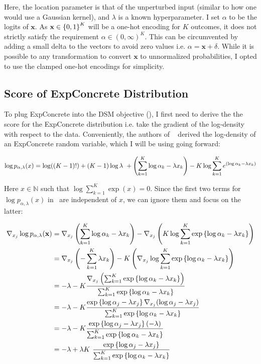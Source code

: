 Here, the location parameter is that of the unperturbed input (similar to how one would use a Gaussian kernel), and $\lambda$ is a known hyperparameter. I set $\alpha$ to be the logits of $\mathbf{x}$. As $\mathbf{x} \in \left\{ {0,1} \right\}^K$ will be a one-hot encoding for $K$ outcomes, it does not strictly satisfy the requirement $\alpha \in (0, \infty)^K$. This can be circumvented by adding a small delta to the vectors to avoid zero values i.e. $\alpha = \mathbf{x} + \delta $. While it is possible to any transformation to convert $\mathbf{x}$ to unnormalized probabilities, I opted to use the clamped one-hot encodings for simplicity.

\subsection*{Score of ExpConcrete Distribution}

To plug ExpConcrete into the DSM objective (), I first need to derive the the score for the ExpConcrete distribution i.e. take the gradient of the log-density with respect to the data. Conveniently, the authors of ~\cite{maddison2017concrete} derived the log-density of an ExpConcrete random variable, which I will be using going forward:

\begin{equation}
    \label{eq:concrete_log_pdf}
         \log p_{\alpha, \lambda}(x) = \log((K-1)!) + (K-1) \log \lambda~ + \left( { \sum_{k=1}^{K} \log \alpha_k - \lambda x_k } \right) -
         K\log \sum_{k=1}^{K} e^{(\log \alpha_k - \lambda x_k)}
\end{equation}

Here $x \in \mathbb{N} $ such that $ \log \sum_{k=1}^{K} \exp (x) = 0$. Since the first two terms for $\log p_{\alpha, \lambda}(x)$ in~ are independent of $x$, we can ignore them and focus on the latter:

\begin{align}
    \nabla_{x_j} \log p_{\alpha, \lambda}(\mathbf{x}) &= 
    \nabla_{x_j} \left( { \sum_{k=1}^{K} \log \alpha_k - \lambda x_k } \right) -
    \nabla_{x_j} \left( {K\log \sum_{k=1}^{K} \exp \left\{ {\log \alpha_k - \lambda x_k} \right\} } \right) \\
    &= \nabla_{x_j} \left( { - \sum_{k=1}^{K} \lambda x_k } \right) -
   K \left( { \nabla_{x_j} \log \sum_{k=1}^{K} \exp \left\{ {\log \alpha_k - \lambda x_k} \right\}} \right) \\
    &= - \lambda -K\frac{\nabla_{x_j} \left( {\sum_{k=1}^{K} \exp \left\{ {\log \alpha_k - \lambda x_k} \right\}} \right)}{ \sum_{k=1}^{K} \exp \left\{ {\log \alpha_k - \lambda x_k} \right\}} \\
    &= - \lambda -K\frac{\exp \left\{ {\log \alpha_j - \lambda x_j} \right\} \nabla_{x_j} (\log \alpha_j - \lambda x_j)}{ \sum_{k=1}^{K} \exp \left\{ {\log \alpha_k - \lambda x_k} \right\}} \\
    &= - \lambda -K\frac{\exp \left\{ {\log \alpha_j - \lambda x_j} \right\} (- \lambda) }{ \sum_{k=1}^{K} \exp \left\{ {\log \alpha_k - \lambda x_k} \right\}} \\
    &= - \lambda + \lambda K~\frac{\exp \left\{ {\log \alpha_j - \lambda x_j} \right\}}{ \sum_{k=1}^{K} \exp \left\{ {\log \alpha_k - \lambda x_k} \right\}}
\end{align}

